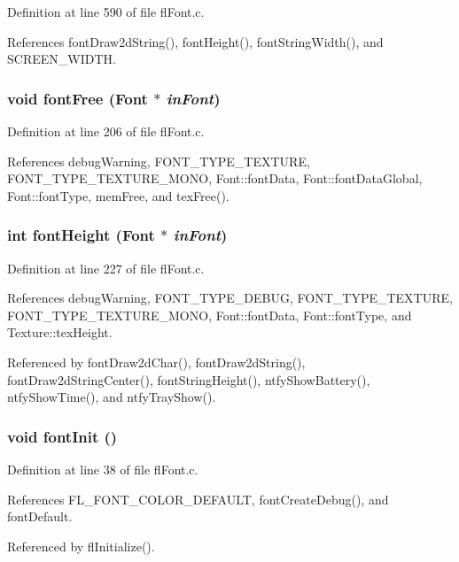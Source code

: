 Definition at line 590 of file fl\-Font.c.

References font\-Draw2d\-String(), font\-Height(), font\-String\-Width(), and SCREEN\_\-WIDTH.
\subsubsection{\setlength{\rightskip}{0pt plus 5cm}void font\-Free ({\bf Font} $\ast$ {\em in\-Font})}\label{flFont_8h_9ba3d4e083b5da133a02be810608c100}




Definition at line 206 of file fl\-Font.c.

References debug\-Warning, FONT\_\-TYPE\_\-TEXTURE, FONT\_\-TYPE\_\-TEXTURE\_\-MONO, Font::font\-Data, Font::font\-Data\-Global, Font::font\-Type, mem\-Free, and tex\-Free().
\subsubsection{\setlength{\rightskip}{0pt plus 5cm}int font\-Height ({\bf Font} $\ast$ {\em in\-Font})}\label{flFont_8h_52a6b73a87f357f4063ff8ebc8e5f974}




Definition at line 227 of file fl\-Font.c.

References debug\-Warning, FONT\_\-TYPE\_\-DEBUG, FONT\_\-TYPE\_\-TEXTURE, FONT\_\-TYPE\_\-TEXTURE\_\-MONO, Font::font\-Data, Font::font\-Type, and Texture::tex\-Height.

Referenced by font\-Draw2d\-Char(), font\-Draw2d\-String(), font\-Draw2d\-String\-Center(), font\-String\-Height(), ntfy\-Show\-Battery(), ntfy\-Show\-Time(), and ntfy\-Tray\-Show().
\subsubsection{\setlength{\rightskip}{0pt plus 5cm}void font\-Init ()}\label{flFont_8h_0416d15ad6ddec5fe49d09760dceee01}




Definition at line 38 of file fl\-Font.c.

References FL\_\-FONT\_\-COLOR\_\-DEFAULT, font\-Create\-Debug(), and font\-Default.

Referenced by fl\-Initialize().
